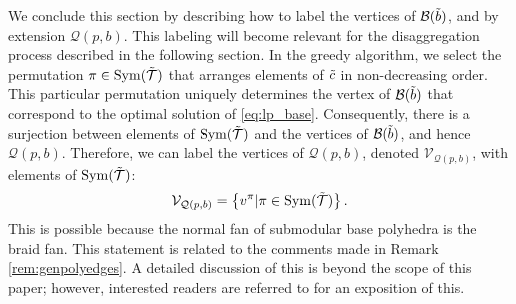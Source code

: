 We conclude this section by describing how to label the vertices of $\mathcal{B}(\Tilde{b})$, and by extension $\mathcal{Q}(p,b)$. This labeling will become relevant for the disaggregation process described in the following section. In the greedy algorithm, we select the permutation $\pi \in \mathrm{Sym}(\Tilde{\mathcal{T}})$ that arranges elements of $\Tilde{c}$ in non-decreasing order. This particular permutation uniquely determines the vertex of $\mathcal{B}(\Tilde{b})$ that correspond to the optimal solution of \eqref{eq:lp_base}. Consequently, there is a surjection between elements of  $\mathrm{Sym}(\Tilde{\mathcal{T}})$ and the vertices of $\mathcal{B}(\Tilde{b})$, and hence $\mathcal{Q}(p,b)$. Therefore, we can label the vertices of $\mathcal{Q}(p,b)$, denoted $ \mathcal{V}_{\mathcal{Q}(p,b)}$, with elements of $\mathrm{Sym}(\Tilde{\mathcal{T}})$: 
\begin{equation}\label{eq:vertex_set}
    \mathcal{V}_{\mathcal{Q}(p,b)}  = \left\{ v^\pi | \pi \in \mathrm{Sym}(\Tilde{\mathcal{T}}) \right\}.
\end{equation}
This is possible because the normal fan of submodular base polyhedra is the braid fan. This statement is related to the comments made in Remark \ref{rem:genpolyedges}. A detailed discussion of this is beyond the scope of this paper; however, interested readers are referred to \cite{Postnikov2009PermutohedraBeyond} for an exposition of this.

